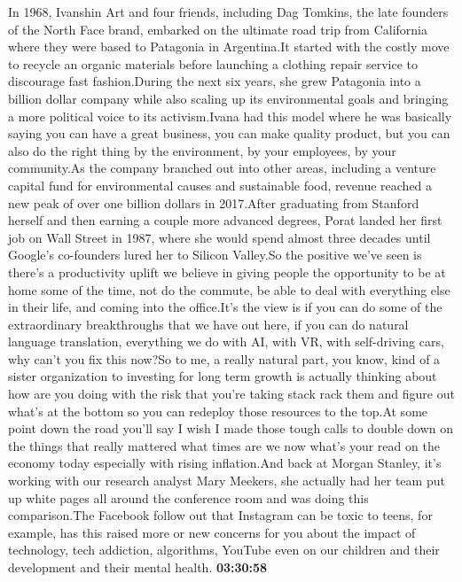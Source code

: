 \documentclass{article}%
\begin{document}
In 1968, Ivanshin Art and four friends, including Dag Tomkins, the late founders of the North Face brand, embarked on the ultimate road trip from California where they were based to Patagonia in Argentina.It started with the costly move to recycle an organic materials before launching a clothing repair service to discourage fast fashion.During the next six years, she grew Patagonia into a billion dollar company while also scaling up its environmental goals and bringing a more political voice to its activism.Ivana had this model where he was basically saying you can have a great business, you can make quality product, but you can also do the right thing by the environment, by your employees, by your community.As the company branched out into other areas, including a venture capital fund for environmental causes and sustainable food, revenue reached a new peak of over one billion dollars in 2017.After graduating from Stanford herself and then earning a couple more advanced degrees, Porat landed her first job on Wall Street in 1987, where she would spend almost three decades until Google's co{-}founders lured her to Silicon Valley.So the positive we've seen is there's a productivity uplift we believe in giving people the opportunity to be at home some of the time, not do the commute, be able to deal with everything else in their life, and coming into the office.It's the view is if you can do some of the extraordinary breakthroughs that we have out here, if you can do natural language translation, everything we do with AI, with VR, with self{-}driving cars, why can't you fix this now?So to me, a really natural part, you know, kind of a sister organization to investing for long term growth is actually thinking about how are you doing with the risk that you're taking stack rack them and figure out what's at the bottom so you can redeploy those resources to the top.At some point down the road you'll say I wish I made those tough calls to double down on the things that really mattered what times are we now what's your read on the economy today especially with rising inflation.And back at Morgan Stanley, it's working with our research analyst Mary Meekers, she actually had her team put up white pages all around the conference room and was doing this comparison.The Facebook follow out that Instagram can be toxic to teens, for example, has this raised more or new concerns for you about the impact of technology, tech addiction, algorithms, YouTube even on our children and their development and their mental health.%
\textbf{03:30:58}%
\end{document}
